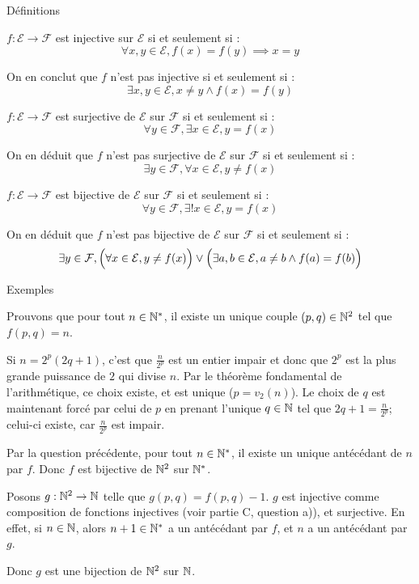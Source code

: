 \documentclass[]{../templates/homework}
\begin{document}
\newcommand{\E}{\mathcal E}
\newcommand{\F}{\mathcal F}
\newcommand{\G}{\mathcal G}

 {Définitions}
\subproblem

$f: \E \rightarrow \F$ est injective sur $\E$ si et seulement si :
$$\forall x,y \in \E, f(x) = f(y) \implies x = y$$

On en conclut que $f$ n'est pas injective si et seulement si :
$$\exists x,y \in \E, x \neq y \land f(x) = f(y)$$

\subproblem
$f: \E \rightarrow \F$ est surjective de $\E$ sur $\F$ si et seulement si :
$$\forall y \in \F, \exists x \in \E, y = f(x)$$

On en déduit que $f$ n'est pas surjective de $\E$ sur $\F$ si et seulement si :
$$\exists y \in \F, \forall x\in\E, y \neq f(x)$$

\subproblem
$f: \E \rightarrow \F$ est bijective de $\E$ sur $\F$ si et seulement si :
$$\forall y \in \F, \exists ! x \in \E, y = f(x)$$

On en déduit que $f$ n'est pas bijective de $\E$ sur $\F$ si et seulement si :
$$\exists y \in \F,\Bigl(\forall x\in\E, y \neq f(x)\Bigr) \lor \Bigl(\exists a,b\in\E, a\neq b \land f(a) = f(b)\Bigr)$$

 {Exemples}
\setcounter{subproblem}{0}
\subproblem

\subproblem

\subproblem
\question Prouvons que pour tout $n\in\mathbb N^{*}$, il existe un unique couple $(p,q) \in \mathbb N^{2}$ tel que $f(p,q)= n$.

Si $n=2^{p}(2q+1)$, c'est que $\frac {n} {2^{p}}$ est un entier impair et donc que $2^{p}$ est la plus grande puissance de $2$ qui divise $n$. Par le théorème fondamental de l'arithmétique, ce choix existe, et est unique ($p = v_{2}(n)$). Le choix de $q$ est maintenant forcé par celui de $p$ en prenant l'unique $q\in\mathbb N$ tel que $2q+1 = \frac n {2^{p}}$; celui-ci existe, car $\frac n {2^{p}}$ est impair.

\question Par la question précédente, pour tout $n\in\mathbb N^{*}$, il existe un unique antécédant de $n$ par $f$. Donc $f$ est bijective de $\mathbb N^{2}$ sur $\mathbb N^{*}$.

\question Posons $g: \mathbb N^{2} \rightarrow \mathbb N$ telle que $g(p,q) = f(p,q)-1$. $g$ est injective comme composition de fonctions injectives (voir partie C, question a)), et surjective. En effet, si $n\in\mathbb N$, alors $n+1 \in \mathbb N^{*}$ a un antécédant par $f$, et $n$ a un antécédant par $g$.

Donc $g$ est une bijection de $\mathbb N^{2}$ sur $\mathbb N$.
\end{document}
